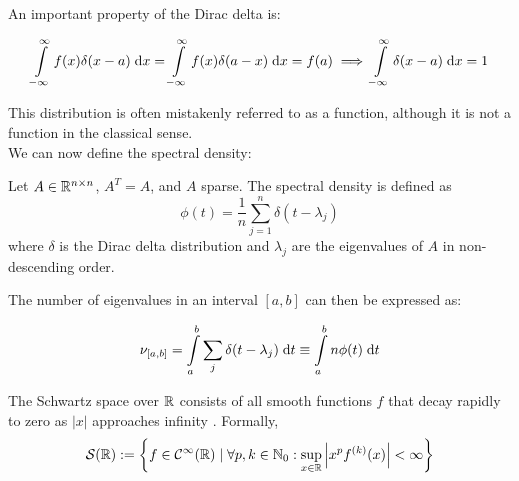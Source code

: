 An important property of the Dirac delta is:

$$\int\limits_{-\infty}^{\infty} f(x) \delta(x-a) \;\mathrm{d}x = \int\limits_{-\infty}^{\infty} f(x) \delta(a-x) \;\mathrm{d}x = f(a) \implies \int\limits_{-\infty}^{\infty} \delta(x-a) \;\mathrm{d}x = 1$$

This distribution is often mistakenly referred to as a function,
although it is not a function in the classical sense.\\
We can now define the spectral density:

\begin{definition}
    Let $A \in \mathbb{R}^{n \times n}$, $A^T = A$, and $A$ sparse.
    The spectral density is defined as
    $$\phi(t) = \frac{1}{n} \sum_{j=1}^{n} \delta(t - \lambda_j)$$
    where $\delta$ is the Dirac delta distribution and $\lambda_j$ are the eigenvalues of $A$ in non-descending order.
\end{definition}

The number of eigenvalues in an interval $[a, b]$ can then be expressed as:

\begin{equation} \label{eq:nu_a_b}
    \nu_{[a, b]} = \int\limits_a^b \sum_j \delta(t - \lambda_j) \;\mathrm{d}t \equiv \int\limits_a^b n \phi(t) \;\mathrm{d}t
\end{equation}

\begin{definition} \label{def:Schwartz space}
    The Schwartz space over $\mathbb{R}$ consists of all smooth functions $f$ that decay rapidly to zero as $|x|$ approaches infinity \cite{richtmyer}.
    Formally,
    $$\mathcal{S}(\mathbb{R}) := \left\{f \in \mathcal{C}^{\infty}(\mathbb{R}) \mid \forall p, k \in \mathbb{N}_0: \sup_{x \in \mathbb{R}} \left| x^p f^{(k)}(x) \right| < \infty \right\}$$
\end{definition}